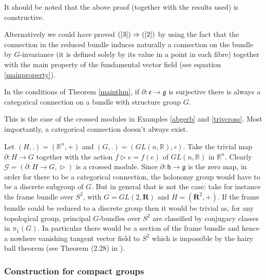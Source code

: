It should be noted that the above proof (together with the results used) is constructive.


Alternatively we could have proved $(\ref{3})\Rightarrow (\ref{2})$ by using the fact that the connection in the reduced bundle induces naturally a connection on the bundle by $G$-invariance (it is defined solely by its value in a point in each fibre) together with the main property of the fundamental vector field (see equation \ref{mainproperty}).

\begin{corollary}
 In the conditions of Theorem \ref{mainthm}, if $\partial:\mathfrak{e}\rightarrow \mathfrak{g}$ is surjective there is always a categorical connection on a bundle with structure group $G$.
\end{corollary}

This is the case of the crossed modules in Examples \ref{abgerb} and \ref{trivcross}. Most importantly, a categorical connection doesn't always exist.
\begin{example}
 Let $(H,.)=(\mathbb{R}^n,+)$ and $(G,.)=(GL(n,\mathbb{R}),\circ)$. Take the trivial map $\partial:H\rightarrow G$ together with the action $f\vartriangleright e=f(e)$ of $GL(n,\mathbb{R})$ in $\mathbb{R}^n$. Clearly $\mathcal{G}=(\partial:H\rightarrow G,\vartriangleright)$ is a crossed module. Since $\partial:\mathfrak{h}\rightarrow \mathfrak{g}$ is the zero map, in order for there to be a categorical connection, the holonomy group would have to be a discrete subgroup of $G$. But in general that is not the case: take for instance the frame bundle over $S^2$, with $G=GL(2,\mathbf{R})$ and $H=(\mathbf{R}^2,+)$. If the frame bundle could be reduced to a discrete group then it would be trivial as, for any topological group, principal $G$-bundles over $S^2$ are classified by conjugacy classes in $\pi_1(G)$. In particular there would be a section of the frame bundle and hence a nowhere vanishing tangent vector field to $S^2$ which is impossible by the hairy ball theorem (see Theorem (2.28) in \cite[p. 135]{hatcher}).
\end{example}


\subsubsection{Construction for compact groups}

